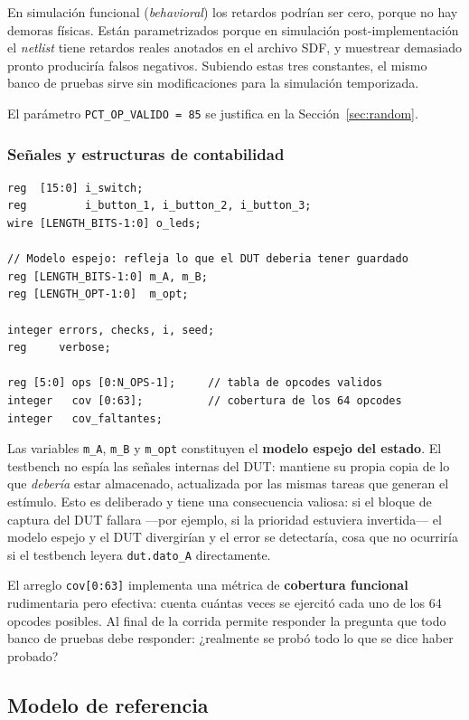 \documentclass[12pt,a4paper]{article}
\begin{document}
En simulación funcional (\emph{behavioral}) los retardos podrían ser cero,
porque no hay demoras físicas. Están parametrizados porque en simulación
post-implementación el \emph{netlist} tiene retardos reales anotados en el
archivo SDF, y muestrear demasiado pronto produciría falsos negativos. Subiendo
estas tres constantes, el mismo banco de pruebas sirve sin modificaciones para
la simulación temporizada.

El parámetro \texttt{PCT\_OP\_VALIDO = 85} se justifica en la
Sección~\ref{sec:random}.

\subsubsection{Señales y estructuras de contabilidad}

\begin{lstlisting}[caption={Señales del testbench.}]
reg  [15:0] i_switch;
reg         i_button_1, i_button_2, i_button_3;
wire [LENGTH_BITS-1:0] o_leds;

// Modelo espejo: refleja lo que el DUT deberia tener guardado
reg [LENGTH_BITS-1:0] m_A, m_B;
reg [LENGTH_OPT-1:0]  m_opt;

integer errors, checks, i, seed;
reg     verbose;

reg [5:0] ops [0:N_OPS-1];     // tabla de opcodes validos
integer   cov [0:63];          // cobertura de los 64 opcodes
integer   cov_faltantes;
\end{lstlisting}

Las variables \texttt{m\_A}, \texttt{m\_B} y \texttt{m\_opt} constituyen el
\textbf{modelo espejo del estado}. El testbench no espía las señales internas
del DUT: mantiene su propia copia de lo que \emph{debería} estar almacenado,
actualizada por las mismas tareas que generan el estímulo. Esto es deliberado y
tiene una consecuencia valiosa: si el bloque de captura del DUT fallara —por
ejemplo, si la prioridad estuviera invertida— el modelo espejo y el DUT
divergirían y el error se detectaría, cosa que no ocurriría si el testbench
leyera \texttt{dut.dato\_A} directamente.

El arreglo \texttt{cov[0:63]} implementa una métrica de \textbf{cobertura
funcional} rudimentaria pero efectiva: cuenta cuántas veces se ejercitó cada uno
de los 64 opcodes posibles. Al final de la corrida permite responder la pregunta
que todo banco de pruebas debe responder: ¿realmente se probó todo lo que se
dice haber probado?

\subsection{Modelo de referencia}
\end{document}
